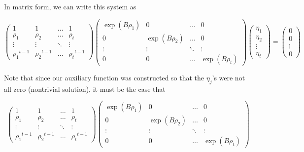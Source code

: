 \documentclass[a4paper, 11pt]{book}
\begin{document}
In matrix form, we can write this system as 

\[
    \begin{pmatrix}
        1 & 1 & \hdots & 1 \\
        \rho_{1} & \rho_{2} & \hdots & {\rho_t} \\ 
        \vdots & \vdots & \ddots & \vdots \\
        {\rho_{1}}^{t-1} & {\rho_{2}}^{t-1} & \hdots & {\rho_t}^{t-1}
    \end{pmatrix} 
    \begin{pmatrix}
        \exp(B\rho_1) & 0 & \hdots & 0 \\
        0 & \exp(B\rho_2) & \hdots & 0 \\
        \vdots & \vdots & \ddots & \vdots \\
        0 & 0 & \hdots & \exp(B\rho_t) 
    \end{pmatrix} 
    \begin{pmatrix}
        \eta_1 \\ \eta_2 \\ \vdots \\ \eta_t
    \end{pmatrix} = 
    \begin{pmatrix}
        0 \\ 0 \\ \vdots \\ 0
    \end{pmatrix} 
\]

Note that since our auxiliary function was constructed so that the $\eta_j$'s were not all zero (nontrivial solution), it must be the case that 

\[
    \begin{pmatrix}
        1 & 1 & \hdots & 1 \\
        \rho_{1} & \rho_{2} & \hdots & {\rho_t} \\ 
        \vdots & \vdots & \ddots & \vdots \\
        {\rho_{1}}^{t-1} & {\rho_{2}}^{t-1} & \hdots & {\rho_t}^{t-1}
    \end{pmatrix} 
    \begin{pmatrix}
        \exp(B\rho_1) & 0 & \hdots & 0 \\
        0 & \exp(B\rho_2) & \hdots & 0 \\
        \vdots & \vdots & \ddots & \vdots \\
        0 & 0 & \hdots & \exp(B\rho_t) 
    \end{pmatrix}\] 
\end{document}
